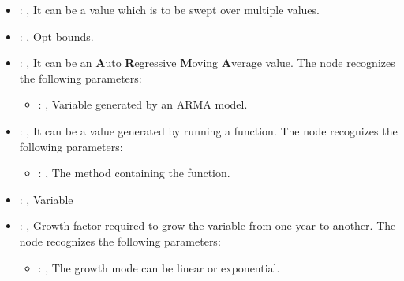 \begin{itemize}
\begin{itemize}
\begin{itemize}
\begin{itemize}
                \item {}: , 
                  It can be a value which is to be swept over multiple values.

                \item {}: , 
                  Opt bounds.

                \item {}: , 
                  It can be an \textbf{A}uto \textbf{R}egressive \textbf{M}oving \textbf{A}verage
                  value.
                  The  node recognizes the following parameters:
                    \begin{itemize}
                      \item {}: , 
                        Variable generated by an ARMA model.
                  \end{itemize}

                \item {}: , 
                  It can be a value generated by running a function.
                  The  node recognizes the following parameters:
                    \begin{itemize}
                      \item {}: , 
                        The method containing the function.
                  \end{itemize}

                \item {}: , 
                  Variable

                \item {}: , 
                  Growth factor required to grow the variable from one year to another.
                  The  node recognizes the following parameters:
                    \begin{itemize}
                      \item {}: , 
                        The growth mode can be linear or exponential.
                  \end{itemize}
              \end{itemize}


\end{itemize}
\end{itemize}
\end{itemize}
